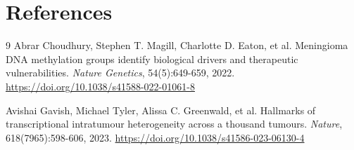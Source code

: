 \documentclass[11pt, a4paper]{article}
\begin{document}
\section{References}
\begin{thebibliography}{9}
Abrar Choudhury, Stephen T. Magill, Charlotte D. Eaton, et al.
\newblock Meningioma DNA methylation groups identify biological drivers and therapeutic vulnerabilities.
\newblock \textit{Nature Genetics}, 54(5):649-659, 2022.
\newblock \url{https://doi.org/10.1038/s41588-022-01061-8}

Avishai Gavish, Michael Tyler, Alissa C. Greenwald, et al.
\newblock Hallmarks of transcriptional intratumour heterogeneity across a thousand tumours.
\newblock \textit{Nature}, 618(7965):598-606, 2023.
\newblock \url{https://doi.org/10.1038/s41586-023-06130-4}
\end{thebibliography}
\end{document}
